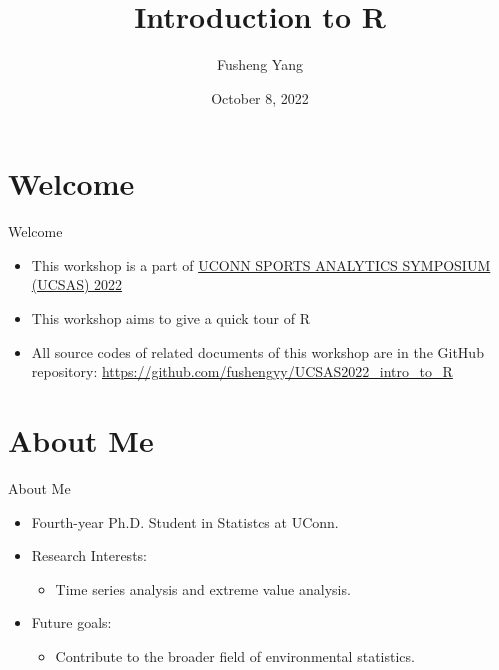 \documentclass{beamer}
\title[Your Short Title]{Introduction to R}
\author{Fusheng Yang}
\institute{Department of Statistics, University of Connecticut}
\date{October 8, 2022}
\begin{document}
\begin{frame}
  \titlepage
\end{frame}


\section{Welcome}

\begin{frame}{Welcome}

\begin{itemize}
  \item This workshop is a part of \href{https://statds.org/events/ucsas2022/index.html}{UCONN SPORTS ANALYTICS SYMPOSIUM (UCSAS) 2022}
  \item This workshop aims to give a quick tour of R
  \item All source codes of related documents of this workshop are in the GitHub repository: \url{https://github.com/fushengyy/UCSAS2022_intro_to_R}
  
\end{itemize}

\end{frame}

\section{About Me}

\begin{frame}{About Me}

\begin{itemize}
  \item Fourth-year Ph.D. Student in Statistcs at UConn.
  \item Research Interests: 
  \begin{itemize}
      \item Time series analysis and extreme value analysis.
  \end{itemize}
  \item Future goals:
  \begin{itemize}
      \item Contribute to the broader field of environmental statistics.
  \end{itemize}
\end{itemize}

\end{frame}
\end{document}
